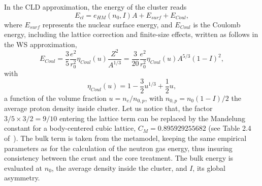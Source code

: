 In the CLD approximation, the energy of the cluster reads
%
\begin{equation}
  E_{cl} = e_{HM}(n_0, I)A + E_{surf} + E_{Coul},
\end{equation}
%
where $E_{surf}$ represents the nuclear surface energy, and $E_{Coul}$ is the Coulomb
energy, including the lattice correction and finite-size effects, written 
as follows in the WS approximation,
%
\begin{equation}
  E_{Coul} = \frac{3}{5}\frac{e^2}{r_0^2}\eta_{Coul}(u)\frac{Z^2}{A^{1/3}} =
  \frac{3}{20}\frac{e^2}{r_0^2}\eta_{Coul}(u)A^{5/3}(1-I)^2,\label{eq:ecoul}
\end{equation}
%
with
%
\begin{equation}
  \eta_{Coul}(u) = 1-\frac{3}{2}u^{1/3} + \frac{1}{2}u,\label{eq:fcoul}
\end{equation}
%
a function of the volume fraction $u = n_e/n_{0,p}$, with $n_{0,p} =
n_0(1-I)/2$ the average proton density inside cluster. Let us notice that, 
the factor $3/5 \times 3/2 = 9/10$ entering the lattice term can be
replaced by the Mandelung constant for a body-centered cubic lattice, $C_M =
0.895929255682$ (see Table 2.4 of~\cite{Haensel2007}). 
The bulk term is taken from the metamodel, keeping the same empirical parameters
as for the calculation of the neutron gas energy, thus insuring consistency
between the crust and the core treatment. 
The bulk energy is evaluated at $n_0$, the average density inside the cluster, 
and $I$, its global asymmetry.

